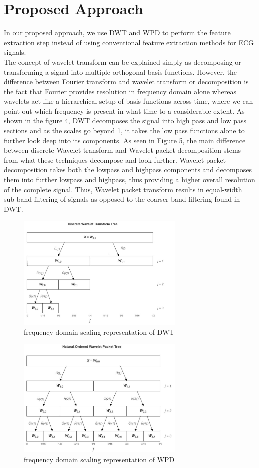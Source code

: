 \documentclass[10pt,twocolumn,letterpaper]{article}
\begin{document}
\section{Proposed Approach}

In our proposed approach, we use DWT and WPD to perform the feature extraction step instead of using conventional feature extraction methods for ECG signals.\\
The concept of wavelet transform can be explained simply as decomposing or transforming a signal into multiple orthogonal basis functions. However, the difference between Fourier transform and wavelet transform or decomposition is the fact that Fourier provides resolution in frequency domain alone whereas wavelets act like a hierarchical setup of basis functions across time, where we can point out which frequency is present in what time to a considerable extent. As shown in the figure 4, DWT decomposes the signal into high pass and low pass sections and as the scales go beyond 1, it takes the low pass functions alone to further look deep into its components. As seen in Figure 5, the main difference between discrete Wavelet transform and Wavelet packet decomposition stems from what these techniques decompose and look further. Wavelet packet decomposition takes both the lowpass and highpass components and decomposes them into further lowpass and highpass, thus providing a higher overall resolution of the complete signal. Thus, Wavelet packet transform results in equal-width sub-band filtering of signals as opposed to the coarser band filtering found in DWT.

\begin{figure}[htbp]
\includegraphics[width=8cm]{dwt.JPG}
\caption{frequency domain scaling representation of DWT}
\label{DWT}
\end{figure}

\begin{figure}[htbp]
\includegraphics[width=8cm]{wpd.JPG}
\caption{frequency domain scaling representation of WPD}
\label{WPD}
\end{figure}
\end{document}
